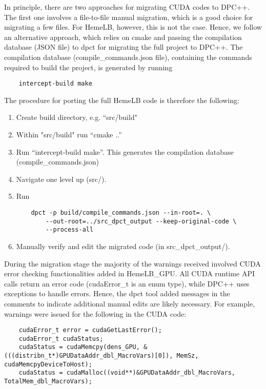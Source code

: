 \documentclass[../main]{subfiles}
\begin{document}
In principle, there are two approaches for migrating CUDA codes to DPC++. 
The first one involves a file-to-file manual migration, which is a good choice for migrating a few files.
For HemeLB, however, this is not the case. Hence, we follow an alternative approach, which relies on cmake and passing the compilation database (JSON file) to dpct for migrating the full project to DPC++.    
The compilation database (compile\_commands.json file), containing the commands required to build the project, is generated by running 
\begin{verbatim}
    intercept-build make
\end{verbatim}

The procedure for porting the full HemeLB code is therefore the following: 
\begin{enumerate}
    \item Create build directory, e.g. ``src/build"
    \item Within "src/build" run ``cmake ..''
    \item Run ``intercept-build make''. This generates the compilation database (compile\_commands.json) 
    \item Navigate one level up (src/). 
    \item Run 
    \begin{verbatim}
    dpct -p build/compile_commands.json --in-root=. \
        --out-root=../src_dpct_output --keep-original-code \
        --process-all
    \end{verbatim}
    \item Manually verify and edit the migrated code (in src\_dpct\_output/).
\end{enumerate}

During the migration stage the majority of the warnings received involved CUDA error checking functionalities added in HemeLB\_GPU. 
All CUDA runtime API calls return an error code (cudaError\_t is an enum type), while DPC++ uses exceptions to handle errors. Hence, the dpct tool added messages in the comments to indicate additional manual edits are likely necessary.
For example, warnings were issued for the following in the CUDA code:  
\begin{verbatim}
    cudaError_t error = cudaGetLastError();
    cudaError_t cudaStatus;
    cudaStatus = cudaMemcpy(dens_GPU, &(((distribn_t*)GPUDataAddr_dbl_MacroVars)[0]), MemSz, cudaMemcpyDeviceToHost);
    cudaStatus = cudaMalloc((void**)&GPUDataAddr_dbl_MacroVars, TotalMem_dbl_MacroVars);
\end{verbatim}
\end{document}

